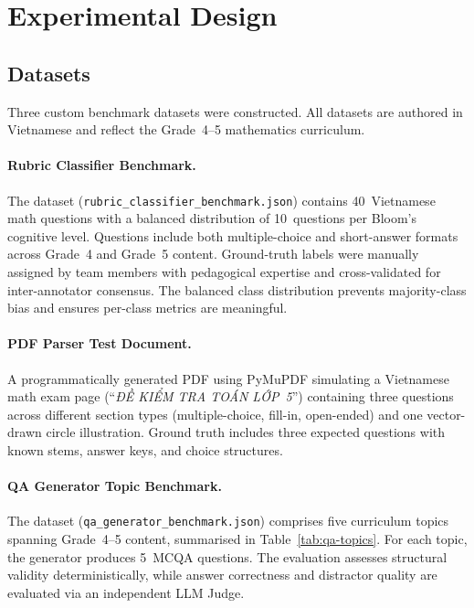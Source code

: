 \documentclass[12pt, a4paper]{article}
\begin{document}
\section{Experimental Design}
\label{sec:experimental-design}

\subsection{Datasets}

Three custom benchmark datasets were constructed. All datasets are authored in Vietnamese and reflect the Grade~4--5 mathematics curriculum.

\paragraph{Rubric Classifier Benchmark.}
The dataset (\texttt{rubric\_classifier\_benchmark.json}) contains 40~Vietnamese math questions with a balanced distribution of 10~questions per Bloom's cognitive level. Questions include both multiple-choice and short-answer formats across Grade~4 and Grade~5 content. Ground-truth labels were manually assigned by team members with pedagogical expertise and cross-validated for inter-annotator consensus. The balanced class distribution prevents majority-class bias and ensures per-class metrics are meaningful.

\paragraph{PDF Parser Test Document.}
A programmatically generated PDF using PyMuPDF simulating a Vietnamese math exam page (``\textit{ĐỀ KIỂM TRA TOÁN LỚP~5}'') containing three questions across different section types (multiple-choice, fill-in, open-ended) and one vector-drawn circle illustration. Ground truth includes three expected questions with known stems, answer keys, and choice structures.

\paragraph{QA Generator Topic Benchmark.}
The dataset (\texttt{qa\_generator\_benchmark.json}) comprises five curriculum topics spanning Grade~4--5 content, summarised in Table~\ref{tab:qa-topics}. For each topic, the generator produces 5~MCQA questions. The evaluation assesses structural validity deterministically, while answer correctness and distractor quality are evaluated via an independent LLM Judge.
\end{document}
